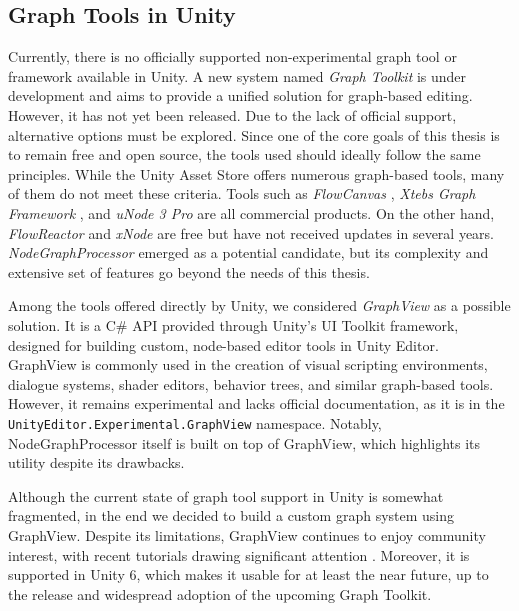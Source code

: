 \subsection{Graph Tools in Unity}
Currently, there is no officially supported non-experimental graph tool or framework available in Unity. A new system named \textit{Graph Toolkit}  \cite{Unity-GraphToolkit} is under development and aims to provide a unified solution for graph-based editing. However, it has not yet been released. Due to the lack of official support, alternative options must be explored. Since one of the core goals of this thesis is to remain free and open source, the tools used should ideally follow the same principles. While the Unity Asset Store offers numerous graph-based tools, many of them do not meet these criteria. Tools such as \textit{FlowCanvas} \cite{FlowCanvas}, \textit{Xtebs Graph Framework} \cite{XtebsGraphFramework}, and \textit{uNode 3 Pro} \cite{uNode3Pro} are all commercial products. On the other hand, \textit{FlowReactor} \cite{FlowReactor} and \textit{xNode} \cite{xNode} are free but have not received updates in several years. \textit{NodeGraphProcessor} \cite{NodeGraphProcessor} emerged as a potential candidate, but its complexity and extensive set of features go beyond the needs of this thesis.

Among the tools offered directly by Unity, we considered \textit{GraphView} \cite{Unity-GraphView} as a possible solution. It is a C\# API provided through Unity’s UI Toolkit framework, designed for building custom, node-based editor tools in Unity Editor. GraphView is commonly used in the creation of visual scripting environments, dialogue systems, shader editors, behavior trees, and similar graph-based tools. However, it remains experimental and lacks official documentation, as it is in the \verb|UnityEditor.Experimental.GraphView| namespace. Notably, NodeGraphProcessor itself is built on top of GraphView, which highlights its utility despite its drawbacks.

Although the current state of graph tool support in Unity is somewhat fragmented, in the end we decided to build a custom graph system using GraphView. Despite its limitations, GraphView continues to enjoy community interest, with recent tutorials drawing significant attention \cite{NodeEditor-YT}. Moreover, it is supported in Unity 6, which makes it usable for at least the near future, up to the release and widespread adoption of the upcoming Graph Toolkit.

